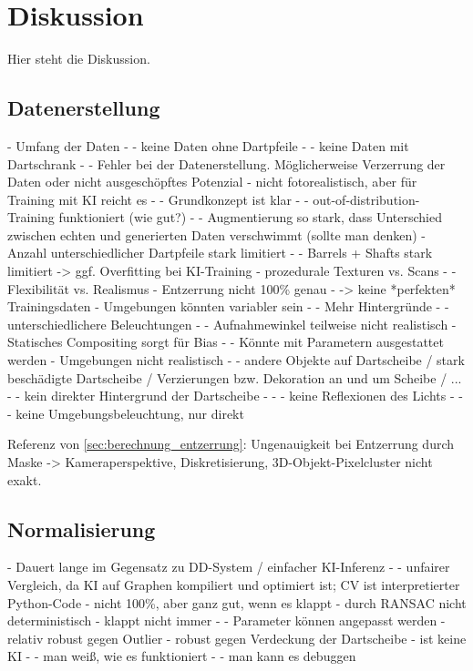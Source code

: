 
\chapter{Diskussion}
\label{cha:diskussion}

Hier steht die Diskussion.

\section{Datenerstellung}
\label{sec:diskussion:daten}

- Umfang der Daten
- - keine Daten ohne Dartpfeile
- - keine Daten mit Dartschrank
- - Fehler bei der Datenerstellung. Möglicherweise Verzerrung der Daten oder nicht ausgeschöpftes Potenzial
- nicht fotorealistisch, aber für Training mit KI reicht es
- - Grundkonzept ist klar
- - out-of-distribution-Training funktioniert (wie gut?)
- - Augmentierung so stark, dass Unterschied zwischen echten und generierten Daten verschwimmt (sollte man denken)
- Anzahl unterschiedlicher Dartpfeile stark limitiert
- - Barrels + Shafts stark limitiert -> ggf. Overfitting bei KI-Training
- prozedurale Texturen vs. Scans
- - Flexibilität vs. Realismus
- Entzerrung nicht 100\% genau
- -> keine *perfekten* Trainingsdaten
- Umgebungen könnten variabler sein
- - Mehr Hintergründe
- - unterschiedlichere Beleuchtungen
- - Aufnahmewinkel teilweise nicht realistisch
- Statisches Compositing sorgt für Bias
- - Könnte mit Parametern ausgestattet werden
- Umgebungen nicht realistisch
- - andere Objekte auf Dartscheibe / stark beschädigte Dartscheibe / Verzierungen bzw. Dekoration an und um Scheibe / ...
- - kein direkter Hintergrund der Dartscheibe
- - - keine Reflexionen des Lichts
- - - keine Umgebungsbeleuchtung, nur direkt

Referenz von \autoref{sec:berechnung_entzerrung}: Ungenauigkeit bei Entzerrung durch Maske -> Kameraperspektive, Diskretisierung, 3D-Objekt-Pixelcluster nicht exakt.

\section{Normalisierung}
\label{sec:diskussion:cv}


- Dauert lange im Gegensatz zu DD-System / einfacher KI-Inferenz
- - unfairer Vergleich, da KI auf Graphen kompiliert und optimiert ist; CV ist interpretierter Python-Code
- nicht 100\%, aber ganz gut, wenn es klappt
- durch RANSAC nicht deterministisch
- klappt nicht immer
- - Parameter können angepasst werden
- relativ robust gegen Outlier
- robust gegen Verdeckung der Dartscheibe
- ist keine KI
- - man weiß, wie es funktioniert
- - man kann es debuggen

